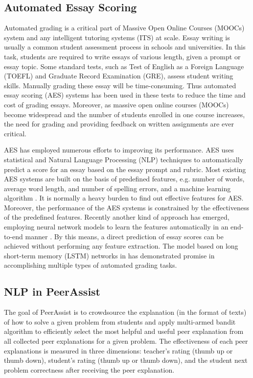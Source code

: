 \documentclass{article}
\begin{document}
\subsection{Automated Essay Scoring}
Automated grading is a critical part of Massive Open Online Courses (MOOCs) system and any intelligent tutoring systems (ITS) at scale. Essay writing is usually a common student assessment process in schools and universities. In this task, students are required to write essays of various length, given a prompt or essay topic. Some standard tests, such as Test of English as a Foreign Language (TOEFL) and Graduate Record Examination (GRE), assess student writing skills. Manually grading these essay will be time-consuming. Thus automated essay scoring (AES) systems has been used in these tests to reduce the time and cost of grading essays. Moreover, as massive open online courses (MOOCs) become widespread and the number of students enrolled in one course increases, the need for grading and providing feedback on written assignments are ever critical.

AES has employed numerous efforts to improving its performance. AES uses statistical and Natural Language Processing (NLP) techniques to automatically predict a score for an essay based on the essay prompt and rubric. Most existing AES systems are built on the basis of predefined features, e.g. number of words, average word length, and number of spelling errors, and a machine learning algorithm \cite{Chen2013-zw}. It is normally a heavy burden to find out effective features for AES. Moreover, the performance of the AES systems is constrained by the effectiveness of the predefined features. Recently another kind of approach has emerged, employing neural network models to learn the features automatically in an end-to-end manner \cite{Taghipour2016-ns}. By this means, a direct prediction of essay scores can be achieved without performing any feature extraction. The model based on long short-term memory (LSTM) networks in \cite{Taghipour2016-ns} has demonstrated promise in accomplishing multiple types of automated grading tasks.

\subsection{NLP in PeerAssist}
The goal of PeerAssist is to crowdsource the explanation (in the
format of texts) of how to solve a
given problem from students and apply multi-armed bandit algorithm to
efficiently select the most helpful and useful peer explanation from all collected
peer explanations for a given problem. The effectiveness of each peer
explanations is measured in three dimensions: teacher's rating (thumb
up or thumb down), student's rating (thumb up or thumb down), and the
student next problem correctness after receiving the peer explanation.


\end{document}
